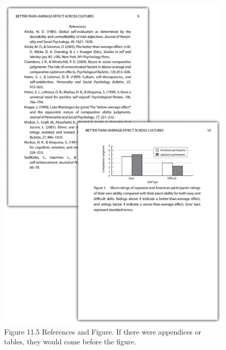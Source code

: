 \begin{figure}




\includegraphics[width=\linewidth]{figures/115}




\caption{Figure 11.5 References and Figure. If there were appendices or tables, they would come before the figure.}




\label{fig:p5}
\end{figure}

